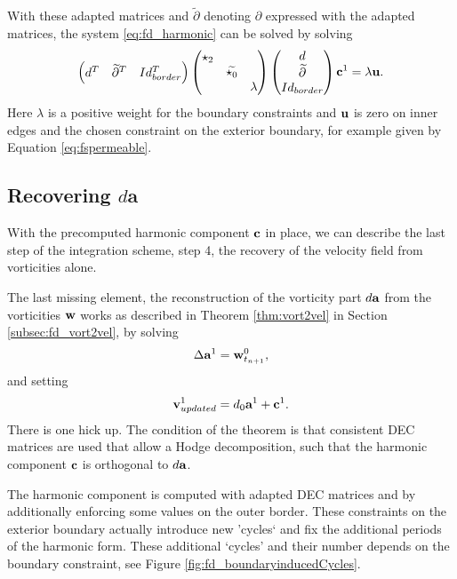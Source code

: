 With these adapted matrices and $\widetilde{\partial}$ denoting $\partial$ expressed with the adapted matrices, the system \ref{eq:fd_harmonic} can be solved by solving
\begin{equation}\begin{pmatrix} d^T & \widetilde{\partial}^T & Id_{border}^T \end{pmatrix} \begin{pmatrix}
\star_2 & & \\
 & \widetilde{\star_0} & \\
 & & \lambda
\end{pmatrix} \begin{pmatrix} d \\
\widetilde{\partial}\\
Id_{border}
\end{pmatrix} \textbf{c}^1= \lambda\textbf{u}.\label{eq:fsharmonic}\end{equation}
Here $\lambda$ is a positive weight for the boundary constraints and $\textbf{u}$ is zero on inner edges and the chosen constraint on the exterior boundary, for example given by Equation \ref{eq:fspermeable}. 

\subsection{Recovering $d\textbf{a}$}
\label{ssec:fd_recovering_da}

With the precomputed harmonic component $\textbf{c}$ in place, we can describe the last step of the integration scheme, step 4, the recovery of the velocity field from vorticities alone.

\pagebreak
The last missing element, the reconstruction of the vorticity part $d\textbf{a}$ from the vorticities $\textbf{w}$ works as described in Theorem \ref{thm:vort2vel} in Section \ref{subsec:fd_vort2vel}, by solving 
\begin{align}\Delta \textbf{a}^1 = \textbf{w}^0_{t_{n+1}}\label{eq:fd_discreteVort2Vel},\end{align}
and setting
\begin{align}
\textbf{v}^1_{updated} =  d_0 \textbf{a}^1 + \textbf{c}^1.\end{align}
There is one hick up. The condition of the theorem is that consistent DEC matrices are used that allow a Hodge decomposition, such that the harmonic component $\textbf{c}$ is orthogonal to $d\textbf{a}$. 

The harmonic component is computed with adapted DEC matrices and by additionally enforcing some values on the outer border.  These constraints on the exterior boundary actually introduce new 'cycles` and fix the additional periods of the harmonic form. These additional `cycles' and their number depends on the boundary constraint, see Figure \ref{fig:fd_boundaryinducedCycles}.


